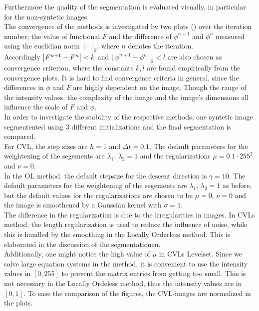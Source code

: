 Furthermore the quality of the segmentation is evaluated visually, in particular for the non-syntetic images.\\
The convergence of the methods is investigated by two plots () over the iteration number; the value of functional $F$ and the difference of $\phi^{n+1}$ and $\phi^n$ measured using the euclidian norm $||\cdot||_2$, where $n$ denotes the iteration.\\
Accordingly $\left| {F^{n+1}-F^n} \right|<k$ and $||\phi^{n+1}-\phi^{n}||_2<l$ are also chosen as convergence criterion, where the constants $k,l$ are found empirically from the convergence plots. It is hard to find convergence criteria in general, since the differences in $\phi$ and $F$ are highly dependent on the image. Though the range of the intensity values, the complexity of the image and the image's dimensions all influence the scale of $F$ and $\phi$.\\
In order to investigate the stability of the respective methods, one syntetic image segmentented using 3 different initializations and the final segmentation is compared.\\

For CVL, the step sizes are $h=1$ and $\Delta t=0.1$. The default parameters for the weightening of the segements are $\lambda_1,\,\lambda_2 = 1$ and the regularizations $\mu = 0.1\cdot 255^2$ and $\nu = 0$.\\
In the OL method, the default stepsize for the descent direction is $\gamma = 10$. The default parameters for the weightening of the segements are $\lambda_1,\,\lambda_2 = 1$ as before, but the default values for the regularizations are chosen to be $\mu=0$, $\nu=0$ and the image is smoothened by a Gaussian kernel with $\sigma = 1$. \\
The difference in the regularization is due to the irregularities in images. In CVLs method, the length regularization is used to reduce the influence of noise, while this is handled by the smoothing in the Locally Orderless method. This is elaborated in the discussion of the segmentationen.\\
Additionally, one might notice the high value of $\mu$ in CVLs Levelset. Since we solve large equation systems in the method, it is convenient to use the intensity values in $[0,255]$ to prevent the matrix entries from getting too small. This is not necessary in the Locally Ordeless method, thus the intensity values are in $[0,1]$. To ease the comparison of the figures, the CVL-images are normalized in the plots.\\

